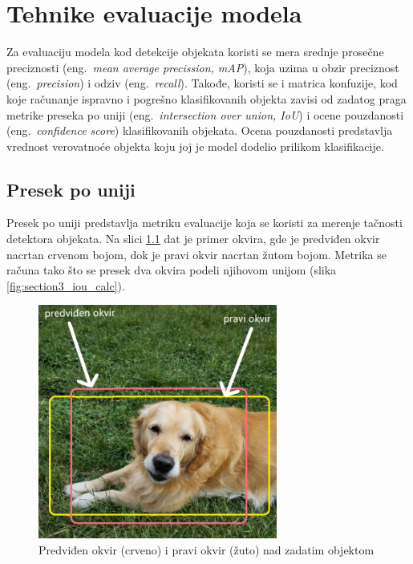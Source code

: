 \documentclass[12pt,oneside]{memoir}
\begin{document}
\chapter{Tehnike evaluacije modela}
\label{section4}
Za evaluaciju modela kod detekcije objekata koristi se mera srednje prosečne preciznosti (eng.~\textit{mean average precission, mAP}), koja uzima u obzir preciznost (eng.~\textit{precision}) i odziv (eng.~\textit{recall}). Takođe, koristi se i matrica konfuzije, kod koje računanje ispravno i pogrešno klasifikovanih objekta zavisi od zadatog praga metrike preseka po uniji (eng.~\textit{intersection over union, IoU}) i ocene pouzdanosti (eng.~\textit{confidence score}) klasifikovanih objekata. Ocena pouzdanosti predstavlja vrednost verovatnoće objekta koju joj je model dodelio prilikom klasifikacije.


\section{Presek po uniji}
Presek po uniji predstavlja metriku evaluacije koja se koristi za merenje tačnosti detektora objekata. Na slici \ref{fig:section3_iou} dat je primer okvira, gde je predviđen okvir nacrtan crvenom bojom, dok je pravi okvir nacrtan žutom bojom. Metrika se računa tako što se presek dva okvira podeli njihovom unijom (slika \ref{fig:section3_iou_calc}).

\begin{figure}[!ht]
    \centering
    \includegraphics[width=0.7\textwidth]{matfmaster/glava3/iou_cus.png}
    \caption{Predviđen okvir (crveno) i pravi okvir (žuto) nad zadatim objektom}
    \label{fig:section3_iou}
\end{figure}
\end{document}
